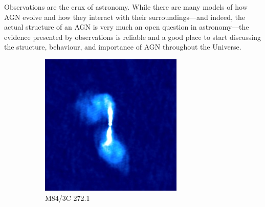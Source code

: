         Observations are the crux of astronomy. While there are many models of how AGN evolve and how they interact with their surroundings---and indeed, the actual structure of an AGN is very much an open question in astronomy---the evidence presented by observations is reliable and a good place to start discussing the structure, behaviour, and importance of AGN throughout the Universe.

        \begin{figure}
            \centering
            \begin{subfigure}{0.45\textwidth}
                \includegraphics[width=\textwidth]{images/3C_272-1.jpg}
                \caption{M84/3C 272.1}
                \label{fig:m84}
            \end{subfigure}
            \begin{subfigure}{0.45\textwidth}

\end{subfigure}
\end{figure}
